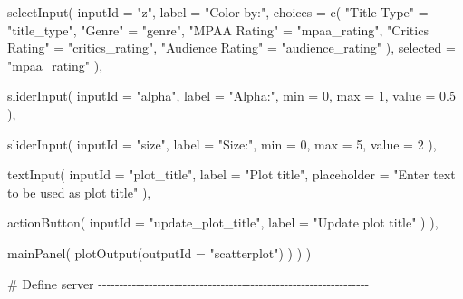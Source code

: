 \documentclass[
  letterpaper,
  DIV=11,
  numbers=noendperiod]{scrreprt}
\newenvironment{Shaded}{\begin{snugshade}}{\end{snugshade}}
\newcommand{\AttributeTok}[1]{\textcolor[rgb]{0.40,0.46,0.14}{#1}}
\newcommand{\CommentTok}[1]{\textcolor[rgb]{0.37,0.37,0.37}{#1}}
\newcommand{\DecValTok}[1]{\textcolor[rgb]{0.68,0.00,0.00}{#1}}
\newcommand{\FloatTok}[1]{\textcolor[rgb]{0.68,0.00,0.00}{#1}}
\newcommand{\FunctionTok}[1]{\textcolor[rgb]{0.28,0.35,0.67}{#1}}
\newcommand{\NormalTok}[1]{\textcolor[rgb]{0.00,0.46,0.62}{#1}}
\newcommand{\OtherTok}[1]{\textcolor[rgb]{0.00,0.46,0.62}{#1}}
\newcommand{\StringTok}[1]{\textcolor[rgb]{0.13,0.47,0.30}{#1}}
\begin{document}
\begin{Shaded}
\begin{Highlighting}[]
      \FunctionTok{selectInput}\NormalTok{(}
        \AttributeTok{inputId =} \StringTok{"z"}\NormalTok{,}
        \AttributeTok{label =} \StringTok{"Color by:"}\NormalTok{,}
        \AttributeTok{choices =} \FunctionTok{c}\NormalTok{(}
          \StringTok{"Title Type"} \OtherTok{=} \StringTok{"title\_type"}\NormalTok{,}
          \StringTok{"Genre"} \OtherTok{=} \StringTok{"genre"}\NormalTok{,}
          \StringTok{"MPAA Rating"} \OtherTok{=} \StringTok{"mpaa\_rating"}\NormalTok{,}
          \StringTok{"Critics Rating"} \OtherTok{=} \StringTok{"critics\_rating"}\NormalTok{,}
          \StringTok{"Audience Rating"} \OtherTok{=} \StringTok{"audience\_rating"}
\NormalTok{        ),}
        \AttributeTok{selected =} \StringTok{"mpaa\_rating"}
\NormalTok{      ),}

      \FunctionTok{sliderInput}\NormalTok{(}
        \AttributeTok{inputId =} \StringTok{"alpha"}\NormalTok{,}
        \AttributeTok{label =} \StringTok{"Alpha:"}\NormalTok{,}
        \AttributeTok{min =} \DecValTok{0}\NormalTok{, }\AttributeTok{max =} \DecValTok{1}\NormalTok{,}
        \AttributeTok{value =} \FloatTok{0.5}
\NormalTok{      ),}

      \FunctionTok{sliderInput}\NormalTok{(}
        \AttributeTok{inputId =} \StringTok{"size"}\NormalTok{,}
        \AttributeTok{label =} \StringTok{"Size:"}\NormalTok{,}
        \AttributeTok{min =} \DecValTok{0}\NormalTok{, }\AttributeTok{max =} \DecValTok{5}\NormalTok{,}
        \AttributeTok{value =} \DecValTok{2}
\NormalTok{      ),}

      \FunctionTok{textInput}\NormalTok{(}
        \AttributeTok{inputId =} \StringTok{"plot\_title"}\NormalTok{,}
        \AttributeTok{label =} \StringTok{"Plot title"}\NormalTok{,}
        \AttributeTok{placeholder =} \StringTok{"Enter text to be used as plot title"}
\NormalTok{      ),}

      \FunctionTok{actionButton}\NormalTok{(}
        \AttributeTok{inputId =} \StringTok{"update\_plot\_title"}\NormalTok{,}
        \AttributeTok{label =} \StringTok{"Update plot title"}
\NormalTok{      )}
\NormalTok{    ),}

    \FunctionTok{mainPanel}\NormalTok{(}
      \FunctionTok{plotOutput}\NormalTok{(}\AttributeTok{outputId =} \StringTok{"scatterplot"}\NormalTok{)}
\NormalTok{    )}
\NormalTok{  )}
\NormalTok{)}

\CommentTok{\# Define server {-}{-}{-}{-}{-}{-}{-}{-}{-}{-}{-}{-}{-}{-}{-}{-}{-}{-}{-}{-}{-}{-}{-}{-}{-}{-}{-}{-}{-}{-}{-}{-}{-}{-}{-}{-}{-}{-}{-}{-}{-}{-}{-}{-}{-}{-}{-}{-}{-}{-}{-}{-}{-}{-}{-}{-}{-}{-}{-}{-}{-}{-}{-}{-}}


\end{Highlighting}
\end{Shaded}
\end{document}

